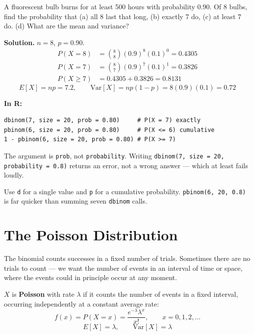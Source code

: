 \documentclass[a4paper,11pt]{article}
\newcommand{\Rc}{\textbf{\color{NavyBlue}In R:}\ }
\begin{document}
\begin{example}
A fluorescent bulb burns for at least 500 hours with probability $0.90$. Of 8
bulbs, find the probability that (a) all 8 last that long, (b) exactly 7 do,
(c) at least 7 do. (d) What are the mean and variance?

\medskip
\textbf{Solution.} $n = 8$, $p = 0.90$.
\begin{align*}
P(X = 8) &= \binom{8}{8}(0.9)^8(0.1)^0 = 0.4305 \\
P(X = 7) &= \binom{8}{7}(0.9)^7(0.1)^1 = 0.3826 \\
P(X \ge 7) &= 0.4305 + 0.3826 = 0.8131
\end{align*}
\[ E[X] = np = 7.2, \qquad \mathrm{Var}[X] = np(1-p) = 8(0.9)(0.1) = 0.72 \]
\end{example}

\Rc
\begin{lstlisting}
dbinom(7, size = 20, prob = 0.80)     # P(X = 7) exactly
pbinom(6, size = 20, prob = 0.80)     # P(X <= 6) cumulative
1 - pbinom(6, size = 20, prob = 0.80) # P(X >= 7)
\end{lstlisting}

\begin{watchbox}
The argument is \texttt{prob}, not \texttt{probability}. Writing
\texttt{dbinom(7, size = 20, probability = 0.8)} returns an error, not a wrong
answer --- which at least fails loudly.

Use \texttt{d} for a single value and \texttt{p} for a cumulative probability.
\texttt{pbinom(6, 20, 0.8)} is far quicker than summing seven \texttt{dbinom}
calls.
\end{watchbox}

\section{The Poisson Distribution}

The binomial counts successes in a fixed number of trials. Sometimes there are
no trials to count --- we want the number of events in an interval of time or
space, where the events could in principle occur at any moment.

\begin{keybox}
$X$ is \textbf{Poisson} with rate $\lambda$ if it counts the number of events in
a fixed interval, occurring independently at a constant average rate:
\[ f(x) = P(X = x) = \frac{e^{-\lambda}\lambda^{x}}{x!}, \qquad x = 0, 1, 2, \ldots \]
\[ E[X] = \lambda, \qquad \mathrm{Var}[X] = \lambda \]
\end{keybox}
\end{document}
